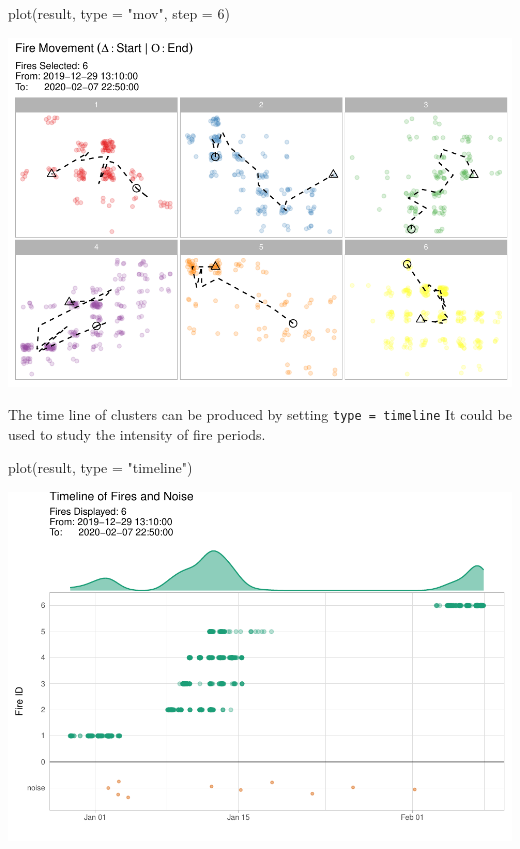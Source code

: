 \begin{Schunk}
\begin{Sinput}
plot(result, type = "mov", step = 6)
\end{Sinput}


\begin{center}\includegraphics[width=0.8\linewidth]{clustering_paper_files/figure-latex/unnamed-chunk-11-1} \end{center}

\end{Schunk}

The time line of clusters can be produced by setting
\texttt{type\ =\ \textquotesingle{}timeline\textquotesingle{}} It could
be used to study the intensity of fire periods.

\begin{Schunk}
\begin{Sinput}
plot(result, type = "timeline")
\end{Sinput}


\begin{center}\includegraphics[width=0.8\linewidth]{clustering_paper_files/figure-latex/unnamed-chunk-12-1} \end{center}

\end{Schunk}

